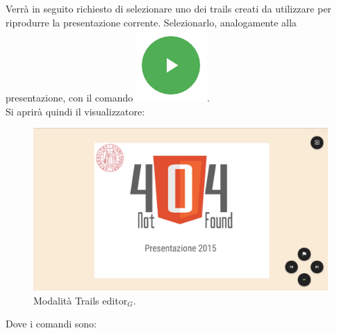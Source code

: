 Verrà in seguito richiesto di selezionare uno dei trails creati da utilizzare per riprodurre la presentazione corrente. Selezionarlo, analogamente alla presentazione, con il comando \includegraphics[scale=0.5]{img/play.png}.\\
Si aprirà quindi il visualizzatore:

\begin{figure}[!h]
\begin{center}
\includegraphics[scale=0.3]{img/viewer.png}
\caption{Modalità Trails editor$_G$.}
\end{center}
\end{figure}

Dove i comandi sono:

